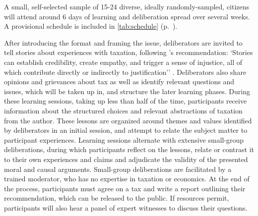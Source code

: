 A small, self-selected sample of 15-24 diverse, ideally randomly-sampled, citizens will attend around 6 days of learning and deliberation spread over several weeks. A provisional schedule is included in \autoref{tab:schedule} (p.~\pageref{tab:schedule}).




After introducing the format and framing the issue, deliberators are invited to tell stories about experiences with taxation, following \citeauthor[67]{Mansbridge2010a}'s recommendation:
`Stories can establish credibility, create empathy, and trigger a sense of injustice, all of which contribute directly or indirectly to justification'' \citeyearpar[67]{Mansbridge2010a}.
Deliberators also share opinions and grievances about tax as well as identify relevant questions and issues, which will be taken up in, and structure the later learning phases.
During these learning sessions, taking up less than half of the time, participants receive information about the structured choices and relevant abstractions of taxation from the author.
These lessons are organized around themes and values identified by deliberators in an initial session, and attempt to relate the subject matter to participant experiences.
Learning sessions alternate with extensive small-group deliberations, during which participants reflect on the lessons, relate or contrast it to their own experiences and claims and adjudicate the validity of the presented moral and causal arguments.
Small-group deliberations are facilitated by a trained moderator, who has no expertise in taxation or economics.
At the end of the process, participants must agree on a tax and write a report outlining their recommendation, which can be released to the public.
If resources permit, participants will also hear a panel of expert witnesses to discuss their questions.


